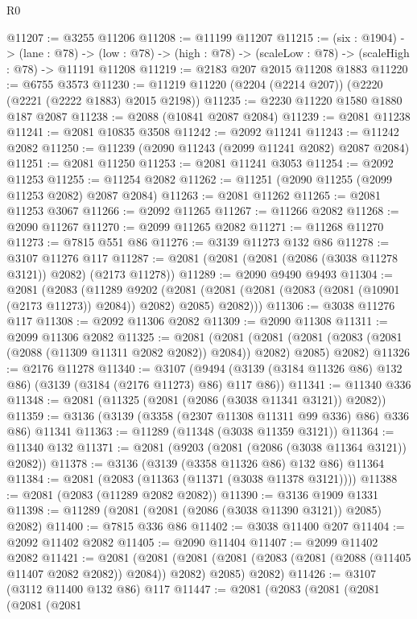 \begin{lexlean}{R0}
\begin{coremodule}
@11207 := @3255 @11206
@11208 := @11199 @11207
@11215 := (six : @1904) ->
  (lane : @78) ->
  (low : @78) -> (high : @78) -> (scaleLow : @78) -> (scaleHigh : @78) -> @11191 @11208
@11219 := @2183 @207 @2015 @11208 @1883
@11220 := @6755 @3573
@11230 := @11219 @11220 (@2204 (@2214 @207)) (@2220 (@2221 (@2222 @1883) @2015 @2198))
@11235 := @2230 @11220 @1580 @1880 @187 @2087
@11238 := @2088 (@10841 @2087 @2084)
@11239 := @2081 @11238
@11241 := @2081 @10835 @3508
@11242 := @2092 @11241
@11243 := @11242 @2082
@11250 := @11239 (@2090 @11243 (@2099 @11241 @2082) @2087 @2084)
@11251 := @2081 @11250
@11253 := @2081 @11241 @3053
@11254 := @2092 @11253
@11255 := @11254 @2082
@11262 := @11251 (@2090 @11255 (@2099 @11253 @2082) @2087 @2084)
@11263 := @2081 @11262
@11265 := @2081 @11253 @3067
@11266 := @2092 @11265
@11267 := @11266 @2082
@11268 := @2090 @11267
@11270 := @2099 @11265 @2082
@11271 := @11268 @11270
@11273 := @7815 @551 @86
@11276 := @3139 @11273 @132 @86
@11278 := @3107 @11276 @117
@11287 := @2081 (@2081 (@2081 (@2086 (@3038 @11278 @3121)) @2082) (@2173 @11278))
@11289 := @2090 @9490 @9493
@11304 := @2081
    (@2083
      (@11289
        @9202
        (@2081 (@2081 (@2081 (@2083 (@2081 (@10901 (@2173 @11273)) @2084)) @2082) @2085) @2082)))
@11306 := @3038 @11276 @117
@11308 := @2092 @11306 @2082
@11309 := @2090 @11308
@11311 := @2099 @11306 @2082
@11325 := @2081
    (@2081
      (@2081 (@2081 (@2083 (@2081 (@2088 (@11309 @11311 @2082 @2082)) @2084)) @2082) @2085)
      @2082)
@11326 := @2176 @11278
@11340 := @3107
    (@9494 (@3139 (@3184 @11326 @86) @132 @86) (@3139 (@3184 (@2176 @11273) @86) @117 @86))
@11341 := @11340 @336
@11348 := @2081 (@11325 (@2081 (@2086 (@3038 @11341 @3121)) @2082))
@11359 := @3136 (@3139 (@3358 (@2307 @11308 @11311 @99 @336) @86) @336 @86) @11341
@11363 := @11289 (@11348 (@3038 @11359 @3121))
@11364 := @11340 @132
@11371 := @2081 (@9203 (@2081 (@2086 (@3038 @11364 @3121)) @2082))
@11378 := @3136 (@3139 (@3358 @11326 @86) @132 @86) @11364
@11384 := @2081 (@2083 (@11363 (@11371 (@3038 @11378 @3121))))
@11388 := @2081 (@2083 (@11289 @2082 @2082))
@11390 := @3136 @1909 @1331
@11398 := @11289 (@2081 (@2081 (@2086 (@3038 @11390 @3121)) @2085) @2082)
@11400 := @7815 @336 @86
@11402 := @3038 @11400 @207
@11404 := @2092 @11402 @2082
@11405 := @2090 @11404
@11407 := @2099 @11402 @2082
@11421 := @2081
    (@2081
      (@2081 (@2081 (@2083 (@2081 (@2088 (@11405 @11407 @2082 @2082)) @2084)) @2082) @2085)
      @2082)
@11426 := @3107 (@3112 @11400 @132 @86) @117
@11447 := @2081
    (@2083
      (@2081
        (@2081
          (@2081
            (@2081

\end{coremodule}
\end{lexlean}

